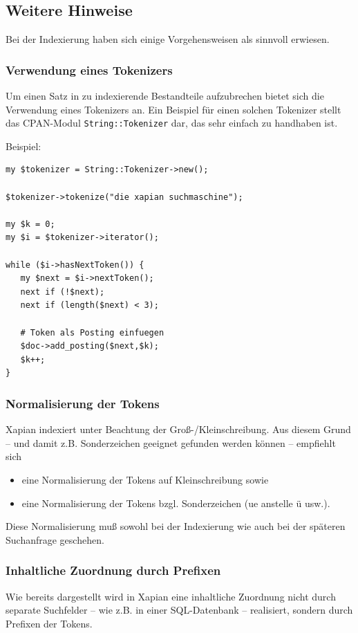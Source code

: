 \documentclass[11pt, twoside, a4paper, BCOR8mm, DIV12, bibtotoc,idxtotoc]{scrbook}
\begin{document}
\subsection{Weitere Hinweise}
Bei der Indexierung haben sich einige Vorgehensweisen als sinnvoll
erwiesen.

\subsubsection{Verwendung eines Tokenizers}
Um einen Satz in zu indexierende Bestandteile aufzubrechen bietet sich
die Verwendung eines Tokenizers an. Ein Beispiel für einen solchen
Tokenizer stellt das CPAN-Modul \texttt{String::Tokenizer} dar, das
sehr einfach zu handhaben ist.

Beispiel:
\begin{verbatim}
my $tokenizer = String::Tokenizer->new();

$tokenizer->tokenize("die xapian suchmaschine");

my $k = 0;        
my $i = $tokenizer->iterator();

while ($i->hasNextToken()) {
   my $next = $i->nextToken();
   next if (!$next);
   next if (length($next) < 3);

   # Token als Posting einfuegen
   $doc->add_posting($next,$k);
   $k++;
}
\end{verbatim}

\subsubsection{Normalisierung der Tokens}
Xapian indexiert unter Beachtung der Groß-/Kleinschreibung. Aus diesem
Grund -- und damit z.B. Sonderzeichen geeignet gefunden werden können
-- empfiehlt sich
\begin{itemize}
\item eine Normalisierung der Tokens auf Kleinschreibung sowie
\item eine Normalisierung der Tokens bzgl. Sonderzeichen (ue anstelle
  ü usw.).
\end{itemize}

Diese Normalisierung muß sowohl bei der Indexierung wie auch bei der
späteren Suchanfrage geschehen.

\subsubsection{Inhaltliche Zuordnung durch Prefixen}

Wie bereits dargestellt wird in Xapian eine inhaltliche Zuordnung
nicht durch separate Suchfelder -- wie z.B. in einer SQL-Datenbank --
realisiert, sondern durch Prefixen der Tokens.
\end{document}
